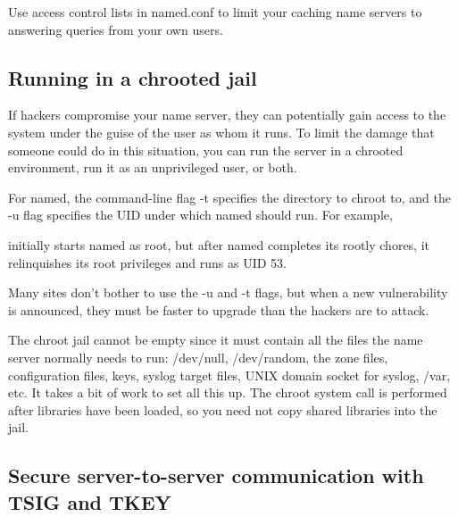 Use access control lists in {named.conf} to limit your caching name
servers to answering queries from your own users.

\protect\hypertarget{part0024_split_056.html}{}{}

\hypertarget{part0024_split_056.htmlux5cux23_idContainer1069}{}
\hypertarget{part0024_split_056.htmlux5cux23calibre_pb_55}{%
\subsection[Running in a {chroot}ed
jail]{\texorpdfstring{\protect\hypertarget{part0024_split_056.htmlux5cux23_idTextAnchor935}{}{}Running
in a {chroot}ed
jail}{Running in a chrooted jail}}\label{part0024_split_056.htmlux5cux23calibre_pb_55}}

\protect\hypertarget{part0024_split_056.htmlux5cux23_idIndexMarker2244}{}{}If
hackers compromise your name server, they can potentially gain access to
the system under the guise of the user as whom it runs. To limit the
damage that someone could do in this situation, you can run the server
in a {chroot}ed environment, run it as an unprivileged user, or both.

For {named}, the command-line flag {-t} specifies the directory to
{chroot} to, and the {-u} flag specifies the UID under which {named}
should run. For example,


initially starts {named} as root, but after {named} completes its rootly
chores, it relinquishes its root privileges and runs as UID 53.

Many sites don't bother to use the {-u} and {-t} flags, but when a new
vulnerability is announced, they must be faster to upgrade than the
hackers are to attack.

The {chroot} jail cannot be empty since it must contain all the files
the name server normally needs to run: {/dev/null}, {/dev/random}, the
zone files, configuration files, keys, syslog target files, UNIX domain
socket for syslog, {/var}, etc. It takes a bit of work to set all this
up. The {chroot} system call is performed after libraries have been
loaded, so you need not copy shared libraries into the jail.

\protect\hypertarget{part0024_split_057.html}{}{}

\hypertarget{part0024_split_057.htmlux5cux23_idContainer1069}{}
\hypertarget{part0024_split_057.htmlux5cux23calibre_pb_56}{%
\subsection[Secure server-to-server communication with TSIG and
TKEY]{\texorpdfstring{\protect\hypertarget{part0024_split_057.htmlux5cux23_idTextAnchor936}{}{}Secure
server-to-server communication with TSIG and
TKEY}{Secure server-to-server communication with TSIG and TKEY}}\label{part0024_split_057.htmlux5cux23calibre_pb_56}}

